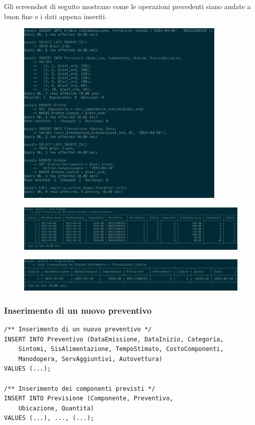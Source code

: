         Gli screenshot di seguito mostrano come le operazioni precedenti siano andate a buon fine e i dati appena inseriti.
        \begin{figure}[H]
          \centering
          \includegraphics[width=10cm]{images/screenshots/nuovo_ordine_1.png}
        \end{figure}

        \begin{figure}[H]
          \centering
          \includegraphics[width=15cm]{images/screenshots/nuovo_ordine_2.png}
        \end{figure}

        \begin{figure}[H]
          \centering
          \includegraphics[width=14cm]{images/screenshots/nuovo_ordine_3.png}
        \end{figure}


			\subsubsection{Inserimento di un nuovo preventivo}

				\begin{lstlisting}
/** Inserimento di un nuovo preventivo */
INSERT INTO Preventivo (DataEmissione, DataInizio, Categoria,
	Sintomi, SisAlimentazione, TempoStimato, CostoComponenti, 
	Manodopera, ServAggiuntivi, Autovettura)
VALUES (...);

/** Inserimento dei componenti previsti */
INSERT INTO Previsione (Componente, Preventivo, 
	Ubicazione, Quantita)
VALUES (...), ..., (...);
				\end{lstlisting}


